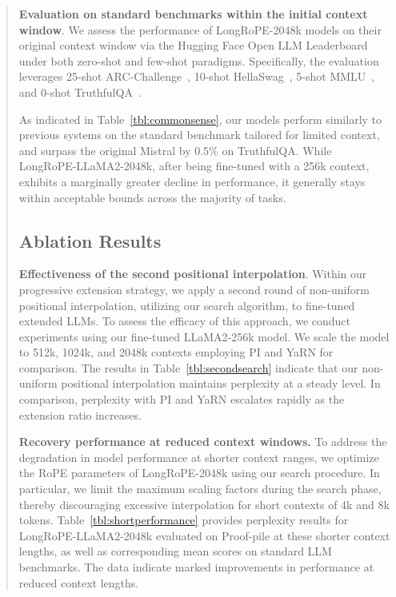 \begin{abstract}
\textbf{Evaluation on standard benchmarks within the initial context window}. We assess the performance of LongRoPE-2048k models on their original context window via the Hugging Face Open LLM Leaderboard~\cite{huggingfaceboard} under both zero-shot and few-shot paradigms. Specifically, the evaluation leverages 25-shot ARC-Challenge~\cite{allenai:arc}, 10-shot HellaSwag~\cite{zellers2019hellaswag}, 5-shot MMLU~\cite{mmlu}, and 0-shot TruthfulQA~\cite{lin2021truthfulqa}.

As indicated in Table~\ref{tbl:commonsense}, our models perform similarly to previous systems on the standard benchmark tailored for limited context, and surpass the original Mistral by 0.5\% on TruthfulQA. While LongRoPE-LLaMA2-2048k, after being fine-tuned with a 256k context, exhibits a marginally greater decline in performance, it generally stays within acceptable bounds across the majority of tasks.

\subsection{Ablation Results}

\textbf{Effectiveness of the second positional interpolation}. Within our progressive extension strategy, we apply a second round of non-uniform positional interpolation, utilizing our search algorithm, to fine-tuned extended LLMs. To assess the efficacy of this approach, we conduct experiments using our fine-tuned LLaMA2-256k model. We scale the model to 512k, 1024k, and 2048k contexts employing PI and YaRN for comparison. The results in Table~\ref{tbl:secondsearch} indicate that our non-uniform positional interpolation maintains perplexity at a steady level. In comparison, perplexity with PI and YaRN escalates rapidly as the extension ratio increases.

\textbf{Recovery performance at reduced context windows.} To address the degradation in model performance at shorter context ranges, we optimize the RoPE parameters of LongRoPE-2048k using our search procedure. In particular, we limit the maximum scaling factors during the search phase, thereby discouraging excessive interpolation for short contexts of 4k and 8k tokens. Table~\ref{tbl:shortperformance} provides perplexity results for LongRoPE-LLaMA2-2048k evaluated on Proof-pile at these shorter context lengths, as well as corresponding mean scores on standard LLM benchmarks. The data indicate marked improvements in performance at reduced context lengths.


\end{abstract}

